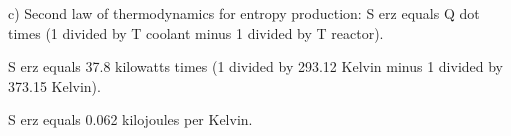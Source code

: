 c) Second law of thermodynamics for entropy production:  
S erz equals Q dot times (1 divided by T coolant minus 1 divided by T reactor).  

S erz equals 37.8 kilowatts times (1 divided by 293.12 Kelvin minus 1 divided by 373.15 Kelvin).  

S erz equals 0.062 kilojoules per Kelvin.
